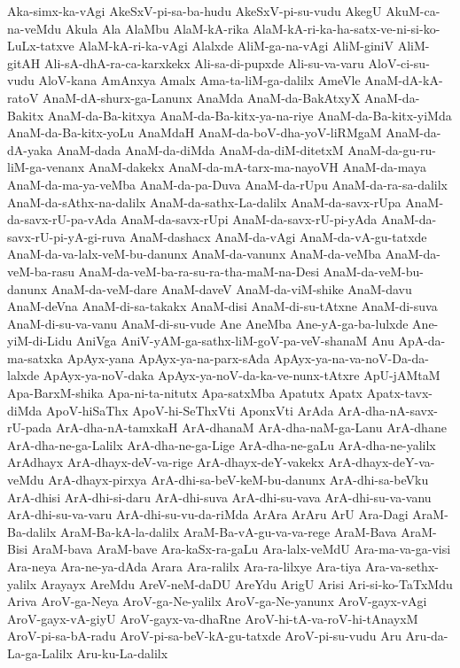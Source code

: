 {Aka-simx-ka-vAgi
AkeSxV-pi-sa-ba-hudu
AkeSxV-pi-su-vudu
AkegU
AkuM-ca-na-veMdu
Akula
Ala
AlaMbu
AlaM-kA-rika
AlaM-kA-ri-ka-ha-satx-ve-ni-si-ko-LuLx-tatxve
AlaM-kA-ri-ka-vAgi
Alalxde
AliM-ga-na-vAgi
AliM-giniV
AliM-gitAH
Ali-sA-dhA-ra-ca-karxkekx
Ali-sa-di-pupxde
Ali-su-va-varu
AloV-ci-su-vudu
AloV-kana
AmAnxya
Amalx
Ama-ta-liM-ga-dalilx
AmeVle
AnaM-dA-kA-ratoV
AnaM-dA-shurx-ga-Lanunx
AnaMda
AnaM-da-BakAtxyX
AnaM-da-Bakitx
AnaM-da-Ba-kitxya
AnaM-da-Ba-kitx-ya-na-riye
AnaM-da-Ba-kitx-yiMda
AnaM-da-Ba-kitx-yoLu
AnaMdaH
AnaM-da-boV-dha-yoV-liRMgaM
AnaM-da-dA-yaka
AnaM-dada
AnaM-da-diMda
AnaM-da-diM-ditetxM
AnaM-da-gu-ru-liM-ga-venanx
AnaM-dakekx
AnaM-da-mA-tarx-ma-nayoVH
AnaM-da-maya
AnaM-da-ma-ya-veMba
AnaM-da-pa-Duva
AnaM-da-rUpu
AnaM-da-ra-sa-dalilx
AnaM-da-sAthx-na-dalilx
AnaM-da-sathx-La-dalilx
AnaM-da-savx-rUpa
AnaM-da-savx-rU-pa-vAda
AnaM-da-savx-rUpi
AnaM-da-savx-rU-pi-yAda
AnaM-da-savx-rU-pi-yA-gi-ruva
AnaM-dashacx
AnaM-da-vAgi
AnaM-da-vA-gu-tatxde
AnaM-da-va-lalx-veM-bu-danunx
AnaM-da-vanunx
AnaM-da-veMba
AnaM-da-veM-ba-rasu
AnaM-da-veM-ba-ra-su-ra-tha-maM-na-Desi
AnaM-da-veM-bu-danunx
AnaM-da-veM-dare
AnaM-daveV
AnaM-da-viM-shike
AnaM-davu
AnaM-deVna
AnaM-di-sa-takakx
AnaM-disi
AnaM-di-su-tAtxne
AnaM-di-suva
AnaM-di-su-va-vanu
AnaM-di-su-vude
Ane
AneMba
Ane-yA-ga-ba-lulxde
Ane-yiM-di-Lidu
AniVga
AniV-yAM-ga-sathx-liM-goV-pa-veV-shanaM
Anu
ApA-da-ma-satxka
ApAyx-yana
ApAyx-ya-na-parx-sAda
ApAyx-ya-na-va-noV-Da-da-lalxde
ApAyx-ya-noV-daka
ApAyx-ya-noV-da-ka-ve-nunx-tAtxre
ApU-jAMtaM
Apa-BarxM-shika
Apa-ni-ta-nitutx
Apa-satxMba
Apatutx
Apatx
Apatx-tavx-diMda
ApoV-hiSaThx
ApoV-hi-SeThxVti
AponxVti
ArAda
ArA-dha-nA-savx-rU-pada
ArA-dha-nA-tamxkaH
ArA-dhanaM
ArA-dha-naM-ga-Lanu
ArA-dhane
ArA-dha-ne-ga-Lalilx
ArA-dha-ne-ga-Lige
ArA-dha-ne-gaLu
ArA-dha-ne-yalilx
ArAdhayx
ArA-dhayx-deV-va-rige
ArA-dhayx-deY-vakekx
ArA-dhayx-deY-va-veMdu
ArA-dhayx-pirxya
ArA-dhi-sa-beV-keM-bu-danunx
ArA-dhi-sa-beVku
ArA-dhisi
ArA-dhi-si-daru
ArA-dhi-suva
ArA-dhi-su-vava
ArA-dhi-su-va-vanu
ArA-dhi-su-va-varu
ArA-dhi-su-vu-da-riMda
ArAra
ArAru
ArU
Ara-Dagi
AraM-Ba-dalilx
AraM-Ba-kA-la-dalilx
AraM-Ba-vA-gu-va-va-rege
AraM-Bava
AraM-Bisi
AraM-bava
AraM-bave
Ara-kaSx-ra-gaLu
Ara-lalx-veMdU
Ara-ma-va-ga-visi
Ara-neya
Ara-ne-ya-dAda
Arara
Ara-ralilx
Ara-ra-lilxye
Ara-tiya
Ara-va-sethx-yalilx
Arayayx
AreMdu
AreV-neM-daDU
AreYdu
ArigU
Arisi
Ari-si-ko-TaTxMdu
Ariva
AroV-ga-Neya
AroV-ga-Ne-yalilx
AroV-ga-Ne-yanunx
AroV-gayx-vAgi
AroV-gayx-vA-giyU
AroV-gayx-va-dhaRne
AroV-hi-tA-va-roV-hi-tAnayxM
AroV-pi-sa-bA-radu
AroV-pi-sa-beV-kA-gu-tatxde
AroV-pi-su-vudu
Aru
Aru-da-La-ga-Lalilx
Aru-ku-La-dalilx
}
